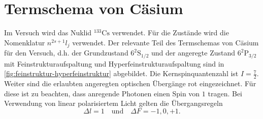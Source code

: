 \documentclass[../bericht.tex]{subfiles}
\begin{document}
    \section{Termschema von Cäsium}
    \label{sec:termschema-caesium}

      Im Versuch wird das Nuklid $\mathrm{^{133}Cs}$ verwendet. Für die Zustände wird die Nomenklatur $n^{2s+1}l_j$  verwendet. Der relevante Teil des Termschemas von Cäsium für den Versuch, d.h. der Grundzustand $\mathrm{6^2 S_{1/2}}$ und der angeregte Zustand $\mathrm{6^2P_{3/2}}$ mit Feinstrukturaufspaltung und Hyperfeinstrukturaufspaltung sind in \cref{fig:feinstruktur-hyperfeinstruktur} abgebildet. Die Kernspinquantenzahl ist $I=\frac{7}{2}$. Weiter sind die erlaubten angeregten optischen Übergänge rot eingezeichnet. Für diese ist zu beachten, dass anregende Photonen einen Spin von $1$ tragen. Bei Verwendung von linear polarisiertem Licht gelten die Übergangsregeln
      \begin{equation*}
        \Delta l = 1\quad \text{und}\quad \Delta F = -1,0,+1.
      \end{equation*}
\end{document}
